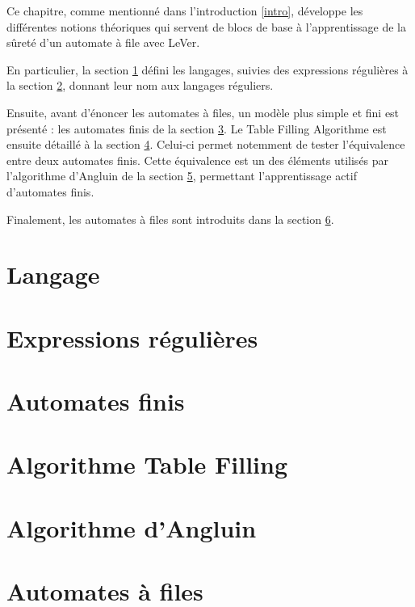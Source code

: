 Ce chapitre, comme mentionné dans l'introduction \ref{intro}, développe les différentes notions théoriques qui servent de blocs de base à l'apprentissage de la sûreté d'un automate à file avec LeVer.

En particulier, la section \ref{lang} défini les langages, suivies des expressions régulières à la section \ref{regex}, donnant leur nom aux langages réguliers.

Ensuite, avant d'énoncer les automates à files, un modèle plus simple et fini est présenté : les automates finis de la section \ref{adf}. Le Table Filling Algorithme est ensuite détaillé à la section \ref{tfa}. Celui-ci permet notemment de tester l'équivalence entre deux automates finis. Cette équivalence est un des éléments utilisés par l'algorithme d'Angluin de la section \ref{angluin}, permettant l'apprentissage actif d'automates finis.

Finalement, les automates à files sont introduits dans la section \ref{fifo}.

\section{Langage}\label{lang}
\section{Expressions régulières}\label{regex}
\section{Automates finis}\label{adf}
\section{Algorithme Table Filling}\label{tfa}
\section{Algorithme d'Angluin}\label{angluin}
\section{Automates à files}\label{fifo}
